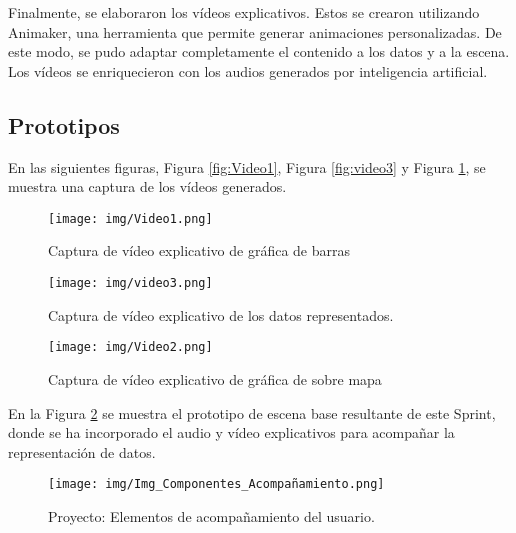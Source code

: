 \documentclass[a4paper, 12pt]{book}
\begin{document}
Finalmente, se elaboraron los vídeos explicativos. Estos se crearon utilizando Animaker, una herramienta que permite generar animaciones personalizadas. De este modo, se pudo adaptar completamente el contenido a los datos y a la escena. Los vídeos se enriquecieron con los audios generados por inteligencia artificial.

            
            
            
            \subsection{Prototipos}
            
           En las siguientes figuras, Figura \ref{fig:Video1}, Figura \ref{fig:video3} y Figura \ref{fig:Video2}, se muestra una captura de los vídeos generados.

            \begin{figure}[h]
                \centering
                \begin{minipage}[b]{0.3\textwidth}
                    \texttt{[image: img/Video1.png]}
                    \caption{Captura de vídeo explicativo de gráfica de barras}
                    \label{fig:Video1}
                \end{minipage}
                \hfill
                \begin{minipage}[b]{0.3\textwidth}
                    \texttt{[image: img/video3.png]}
                    \caption{Captura de vídeo explicativo de los datos representados.}
                    \label{fig:video3}
                \end{minipage}
                \hfill
                \begin{minipage}[b]{0.3\textwidth}
                    \texttt{[image: img/Video2.png]}
                    \caption{Captura de vídeo explicativo de gráfica de sobre mapa}
                    \label{fig:Video2}
                \end{minipage}
            \end{figure}
    

\newpage
            En la Figura \ref{fig:Img_Componentes_Acompañamiento} se muestra el prototipo de escena base resultante de este Sprint, donde se ha incorporado el audio y vídeo explicativos para acompañar la representación de datos.
            \begin{figure}[H]
                \centering
                \texttt{[image: img/Img\_Componentes\_Acompañamiento.png]}
                \caption{Proyecto: Elementos de acompañamiento del usuario.}
                \label{fig:Img_Componentes_Acompañamiento}
            \end{figure}
\end{document}
